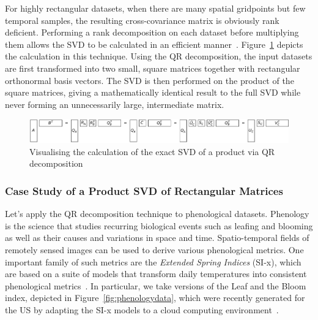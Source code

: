 \documentclass[ijgi,article,submit,moreauthors,pdftex,10pt,a4paper]{Definitions/mdpi}
\begin{document}
For highly rectangular datasets, when there are many spatial gridpoints but few temporal samples, the resulting cross-covariance matrix is obviously rank deficient. Performing a rank decomposition on each dataset before multiplying them allows the SVD to be calculated in an efficient manner~\cite{Chan1982, Tygert2017}. Figure~\ref{fig:qrProductSVD} depicts the calculation in this technique. Using the QR decomposition, the input datasets are first transformed into two small, square matrices together with rectangular orthonormal basis vectors. The SVD is then performed on the product of the square matrices, giving a mathematically identical result to the full SVD while never forming an unnecessarily large, intermediate matrix.

\begin{figure}[H]
\centering
\includegraphics[width=\textwidth]{Results/qrProductSVD.pdf}
\caption[Exact SVD via QR decomposition]{Visualising the calculation of the exact SVD of a product via QR decomposition}
\label{fig:qrProductSVD}
\end{figure}

\subsubsection{Case Study of a Product SVD of Rectangular Matrices}
\label{sec:Results/Case Study of a Product SVD of Rectangular Matrices}

Let's apply the QR decomposition technique to phenological datasets. Phenology is the science that studies recurring biological events such as leafing and blooming as well as their causes and variations in space and time. Spatio-temporal fields of remotely sensed images can be used to derive various phenological metrics. One important family of such metrics are the \textit{Extended Spring Indices} (SI-x), which are based on a suite of models that transform daily temperatures into consistent phenological metrics~\cite{Schwartz2013}. In particular, we take versions of the Leaf and the Bloom index, depicted in Figure~\ref{fig:phenologydata}, which were recently generated for the US by adapting the SI-x models to a cloud computing environment~\cite{Izquierdo2015}. 
\end{document}
